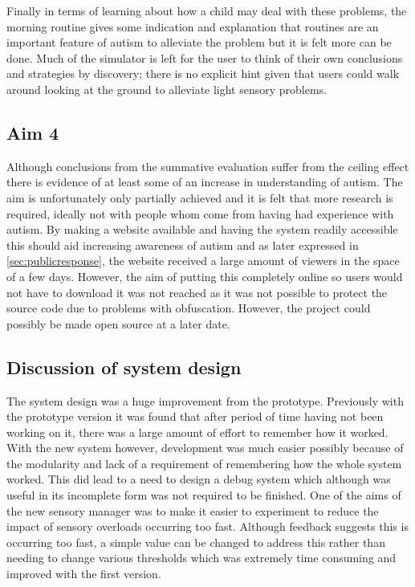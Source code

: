 \documentclass[11pt]{report}
\begin{document}
Finally in terms of learning about how a child may deal with these problems, the morning routine gives some indication and explanation that routines are an important feature of autism to alleviate the problem but it is felt more can be done. Much of the simulator is left for the user to think of their own conclusions and strategies by discovery; there is no explicit hint given that users could walk around looking at the ground to alleviate light sensory problems.


\subsection*{Aim 4}
Although conclusions from the summative evaluation suffer from the ceiling effect there is evidence of at least some of an increase in understanding of autism. The aim is unfortunately only partially achieved and it is felt that more research is required, ideally not with people whom come from having had experience with autism. By making a website available and having the system readily accessible this should aid increasing awareness of autism and as later expressed in \ref{sec:publicresponse}, the website received a large amount of viewers in the space of a few days. However, the aim of putting this completely online so users would not have to download it was not reached as it was not possible to protect the source code due to problems with obfuscation. However, the project could possibly be made open source at a later date.

\subsection{Discussion of system design}
The system design was a huge improvement from the prototype. Previously with the prototype version it was found that after period of time having not been working on it, there was a large amount of effort to remember how it worked. With the new system however, development was much easier possibly because of the modularity and lack of a requirement of remembering how the whole system worked. This did lead to a need to design a debug system which although was useful in its incomplete form was not required to be finished. One of the aims of the new sensory manager was to make it easier to experiment to reduce the impact of sensory overloads occurring too fast. Although feedback suggests this is occurring too fast, a simple value can be changed to address this rather than needing to change various thresholds which was extremely time consuming and improved with the first version. 
\end{document}
